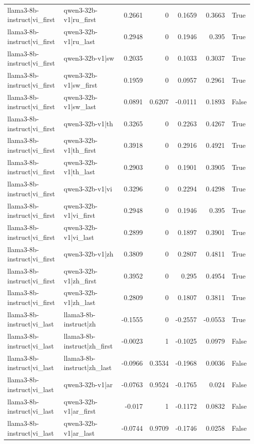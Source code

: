 \begin{table}
\begin{tabular}{l l r r r r l}
llama3-8b-instruct|vi_first & qwen3-32b-v1|ru_first & 0.2661 & 0 & 0.1659 & 0.3663 & True \\
llama3-8b-instruct|vi_first & qwen3-32b-v1|ru_last & 0.2948 & 0 & 0.1946 & 0.395 & True \\
llama3-8b-instruct|vi_first & qwen3-32b-v1|sw & 0.2035 & 0 & 0.1033 & 0.3037 & True \\
llama3-8b-instruct|vi_first & qwen3-32b-v1|sw_first & 0.1959 & 0 & 0.0957 & 0.2961 & True \\
llama3-8b-instruct|vi_first & qwen3-32b-v1|sw_last & 0.0891 & 0.6207 & -0.0111 & 0.1893 & False \\
llama3-8b-instruct|vi_first & qwen3-32b-v1|th & 0.3265 & 0 & 0.2263 & 0.4267 & True \\
llama3-8b-instruct|vi_first & qwen3-32b-v1|th_first & 0.3918 & 0 & 0.2916 & 0.4921 & True \\
llama3-8b-instruct|vi_first & qwen3-32b-v1|th_last & 0.2903 & 0 & 0.1901 & 0.3905 & True \\
llama3-8b-instruct|vi_first & qwen3-32b-v1|vi & 0.3296 & 0 & 0.2294 & 0.4298 & True \\
llama3-8b-instruct|vi_first & qwen3-32b-v1|vi_first & 0.2948 & 0 & 0.1946 & 0.395 & True \\
llama3-8b-instruct|vi_first & qwen3-32b-v1|vi_last & 0.2899 & 0 & 0.1897 & 0.3901 & True \\
llama3-8b-instruct|vi_first & qwen3-32b-v1|zh & 0.3809 & 0 & 0.2807 & 0.4811 & True \\
llama3-8b-instruct|vi_first & qwen3-32b-v1|zh_first & 0.3952 & 0 & 0.295 & 0.4954 & True \\
llama3-8b-instruct|vi_first & qwen3-32b-v1|zh_last & 0.2809 & 0 & 0.1807 & 0.3811 & True \\
llama3-8b-instruct|vi_last & llama3-8b-instruct|zh & -0.1555 & 0 & -0.2557 & -0.0553 & True \\
llama3-8b-instruct|vi_last & llama3-8b-instruct|zh_first & -0.0023 & 1 & -0.1025 & 0.0979 & False \\
llama3-8b-instruct|vi_last & llama3-8b-instruct|zh_last & -0.0966 & 0.3534 & -0.1968 & 0.0036 & False \\
llama3-8b-instruct|vi_last & qwen3-32b-v1|ar & -0.0763 & 0.9524 & -0.1765 & 0.024 & False \\
llama3-8b-instruct|vi_last & qwen3-32b-v1|ar_first & -0.017 & 1 & -0.1172 & 0.0832 & False \\
llama3-8b-instruct|vi_last & qwen3-32b-v1|ar_last & -0.0744 & 0.9709 & -0.1746 & 0.0258 & False \\

\end{tabular}
\end{table}
